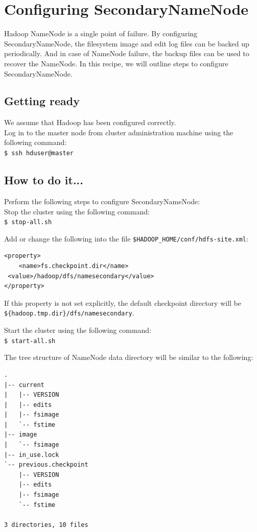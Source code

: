 \section{Configuring SecondaryNameNode}
Hadoop NameNode is a single point of failure. By configuring SecondaryNameNode, the filesystem image and edit log files can be backed up periodically. And in case of NameNode failure, the backup files can be used to recover the NameNode. In this recipe, we will outline steps to configure SecondaryNameNode.
\subsection*{Getting ready}
We assume that Hadoop has been configured correctly.\\
Log in to the master node from cluster administration machine using the following command:\\
\verb|$ ssh hduser@master|

\subsection*{How to do it...}
Perform the following steps to configure SecondaryNameNode: \\
Stop the cluster using the following command: \\
\verb|$ stop-all.sh|

Add or change the following into the file \verb|$HADOOP_HOME/conf/hdfs-site.xml|: 
\begin{verbatim}
<property>
    <name>fs.checkpoint.dir</name>
 <value>/hadoop/dfs/namesecondary</value>
</property>
\end{verbatim}

If this property is not set explicitly, the default checkpoint directory will be \verb|${hadoop.tmp.dir}/dfs/namesecondary|.

Start the cluster using the following command: \\
\verb|$ start-all.sh|

The tree structure of NameNode data directory will be similar to the following:\\
\begin{verbatim}
.
|-- current
|   |-- VERSION
|   |-- edits
|   |-- fsimage
|   `-- fstime
|-- image
|   `-- fsimage
|-- in_use.lock
`-- previous.checkpoint
    |-- VERSION
    |-- edits
    |-- fsimage
    `-- fstime

3 directories, 10 files
\end{verbatim}

